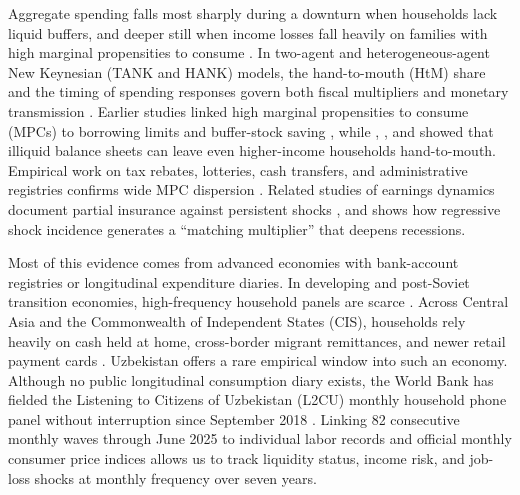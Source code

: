\documentclass[11pt]{article}
\begin{document}
Aggregate spending falls most sharply during a downturn when households lack liquid buffers, and deeper still when income losses fall heavily on families with high marginal propensities to consume \citep{campbell1989consumption,gali2007understanding,bilbiie2008limited,kaplan2018monetary,achdou2022income}. In two-agent and heterogeneous-agent New Keynesian (TANK and HANK) models, the hand-to-mouth (HtM) share and the timing of spending responses govern both fiscal multipliers and monetary transmission \citep{werning2015incomplete,auclert2019monetary,bilbiie2020new,auclert2024intertemporal,debortoli2025heterogeneity}. Earlier studies linked high marginal propensities to consume (MPCs) to borrowing limits and buffer-stock saving \citep{zeldes1989consumption,jappelli1990consumption,carroll1997buffer}, while \citet{kaplan2014model}, \citet{kaplan2014wealthy}, and \citet{aguiar2025hand} showed that illiquid balance sheets can leave even higher-income households hand-to-mouth. Empirical work on tax rebates, lotteries, cash transfers, and administrative registries confirms wide MPC dispersion \citep{sahm2010household,parker2013consumer,jappelli2014fiscal,fagereng2021mpc,fuster2021what,egger2022general,kaplan2022mpc,crawley2023consumption}. Related studies of earnings dynamics document partial insurance against persistent shocks \citep{blundell2008consumption,aguiar2015has,arellano2017earnings}, and \citet{patterson2023matching} shows how regressive shock incidence generates a ``matching multiplier'' that deepens recessions.

Most of this evidence comes from advanced economies with bank-account registries or longitudinal expenditure diaries. In developing and post-Soviet transition economies, high-frequency household panels are scarce \citep{deaton1992understanding,townsend1994risk,morduch1995income}. Across Central Asia and the Commonwealth of Independent States (CIS), households rely heavily on cash held at home, cross-border migrant remittances, and newer retail payment cards \citep{kakhkharov2017transaction,seitz2019migration,abduvaliev2020impact,kakhkharov2021south}. Uzbekistan offers a rare empirical window into such an economy. Although no public longitudinal consumption diary exists, the World Bank has fielded the Listening to Citizens of Uzbekistan (L2CU) monthly household phone panel without interruption since September 2018 \citep{WB2025L2CU}. Linking 82 consecutive monthly waves through June 2025 to individual labor records and official monthly consumer price indices \citep{StatUz2026CPI} allows us to track liquidity status, income risk, and job-loss shocks at monthly frequency over seven years.
\end{document}
